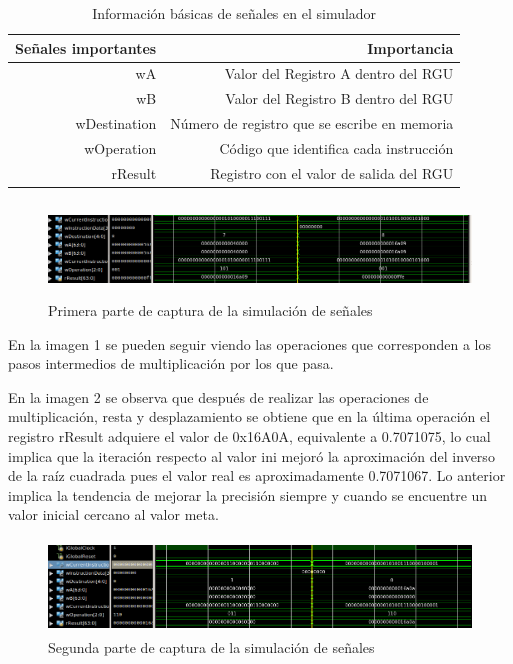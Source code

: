 \begin{table}[htbp]
  \centering
  \caption{Información básicas de señales en el simulador}
    \begin{tabular}{rr}
    \toprule
    Señales importantes & Importancia \\
    \midrule
    wA    & Valor del Registro A dentro del RGU \\
    wB    & Valor del Registro B dentro del RGU \\
    wDestination & Número de registro que se escribe en memoria  \\
    wOperation & Código que identifica cada instrucción \\
    rResult & Registro con el valor de salida del RGU \\
    \bottomrule
    \end{tabular}%
  \label{tab:nombres}%
\end{table}%

\begin{figure}
	\includegraphics[width=1\linewidth, height=2.5cm]{images/Selection_010}
	\caption{Primera parte de captura de la simulación de señales} \label{fig:sim1}
\end{figure}

En la imagen 1 se pueden seguir viendo las operaciones que corresponden a los pasos intermedios de multiplicación por los que pasa.

En la imagen 2 se observa que después de realizar las operaciones de multiplicación, resta y desplazamiento se obtiene que en la última operación el registro rResult adquiere el valor de 0x16A0A, equivalente a 0.7071075, lo cual implica que la iteración respecto al valor ini mejoró la aproximación del inverso de la raíz cuadrada pues el valor real es aproximadamente 0.7071067. Lo anterior implica la tendencia de mejorar la precisión siempre y cuando se encuentre un valor inicial cercano al valor meta. 

\begin{figure}
	\includegraphics[width=1\linewidth, height=2.5cm]{images/Selection_011}
	\caption{Segunda parte de captura de la simulación de señales} \label{fig:sim2}
\end{figure}

